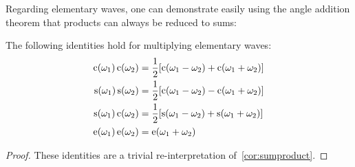 Regarding elementary waves, one can demonstrate easily using the angle addition theorem
that products can always be reduced to sums:
\begin{proposition}
  The following identities hold for multiplying elementary waves:
  \begin{align}
    \operatorname{c}(\omega_1)\operatorname{c}(\omega_2)&=\frac{1}{2}[\operatorname{c}(\omega_1-\omega_2)+\operatorname{c}(\omega_1+\omega_2)]
    \label{eq:cprod}\\
    \operatorname{s}(\omega_1)\operatorname{s}(\omega_2)&=\frac{1}{2}[\operatorname{c}(\omega_1-\omega_2)-\operatorname{c}(\omega_1+\omega_2)]
    \label{eq:sprod}\\
    \operatorname{s}(\omega_1)\operatorname{c}(\omega_2)&=\frac{1}{2}[\operatorname{s}(\omega_1-\omega_2)+\operatorname{s}(\omega_1+\omega_2)]
    \label{eq:scprod}\\
    \operatorname{e}(\omega_1)\operatorname{e}(\omega_2)&=\operatorname{e}(\omega_1+\omega_2)\label{eq:eprod}
  \end{align}
\end{proposition}
\begin{proof}
  These identities are a trivial re-interpretation of~\cref{cor:sumproduct}.
\end{proof}

